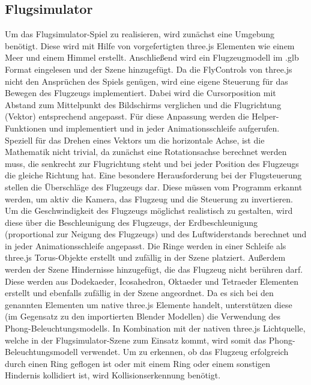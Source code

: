 \subsection{Flugsimulator}

Um das Flugsimulator-Spiel zu realisieren, wird zunächst eine Umgebung benötigt.
Diese wird mit Hilfe von vorgefertigten three.js Elementen wie einem Meer und einem Himmel erstellt.
Anschließend wird ein Flugzeugmodell im .glb Format eingelesen und der Szene hinzugefügt.
\newparagraph
Da die FlyControls von three.js nicht den Ansprüchen des Spiels genügen, wird eine eigene Steuerung für das Bewegen des Flugzeugs implementiert.
Dabei wird die Cursorposition mit Abstand zum Mittelpunkt des Bildschirms verglichen und die Flugrichtung (Vektor) entsprechend angepasst.
Für diese Anpassung werden die Helper-Funktionen  und  implementiert und in jeder Animationsschleife aufgerufen.
Speziell für das Drehen eines Vektors um die horizontale Achse, ist die Mathematik nicht trivial, da zunächst eine Rotationsachse berechnet werden muss, die senkrecht zur Flugrichtung steht und bei jeder Position des Flugzeugs die gleiche Richtung hat.
Eine besondere Herausforderung bei der Flugsteuerung stellen die Überschläge des Flugzeugs dar.
Diese müssen vom Programm erkannt werden, um aktiv die Kamera, das Flugzeug und die Steuerung zu invertieren.
Um die Geschwindigkeit des Flugzeugs möglichst realistisch zu gestalten, wird diese über die Beschleunigung des Flugzeugs, der Erdbeschleunigung (proportional zur Neigung des Flugzeugs) und des Luftwiderstands berechnet und in jeder Animationsschleife angepasst.
\newparagraph
Die Ringe werden in einer Schleife als three.js Torus-Objekte erstellt und zufällig in der Szene platziert.
Außerdem werden der Szene Hindernisse hinzugefügt, die das Flugzeug nicht berühren darf.
Diese werden aus Dodekaeder, Icosahedron, Oktaeder und Tetraeder Elementen erstellt und ebenfalls zufällig in der Szene angeordnet.
Da es sich bei den genannten Elementen um native three.js Elemente handelt, unterstützen diese (im Gegensatz zu den importierten Blender Modellen) die Verwendung des Phong-Beleuchtungsmodells.
In Kombination mit der nativen three.js Lichtquelle, welche in der Flugsimulator-Szene zum Einsatz kommt, wird somit das Phong-Beleuchtungsmodell verwendet.
\newparagraph
Um zu erkennen, ob das Flugzeug erfolgreich durch einen Ring geflogen ist oder mit einem Ring oder einem sonstigen Hindernis kollidiert ist, wird Kollisionserkennung benötigt.
